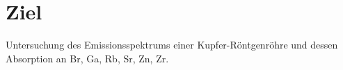 \section{Ziel}
\label{sec:ziel}

Untersuchung des Emissionsspektrums einer Kupfer-Röntgenröhre und dessen Absorption an Br, Ga, Rb, Sr, Zn, Zr.
